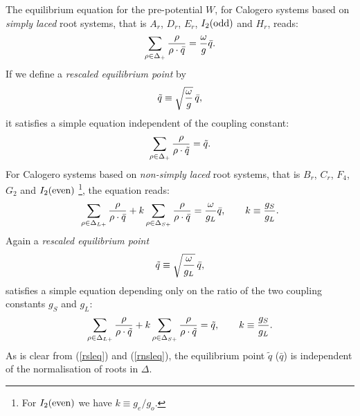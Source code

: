 \documentclass[a4paper,12pt]{article}
\begin{document}
The equilibrium equation for the pre-potential $W$,
for Calogero systems based on {\em simply laced\/} root systems,
that is $A_r$, $D_r$, $E_r$, $I_2(\rm odd)$ and $H_r$, reads:
\[
   \sum_{\rho\in\Delta_+}{\rho\over{\rho\cdot\bar{q}}}={\omega\over{g}}\bar{q}.
\]
If we define a {\em rescaled equilibrium point\/} by
\begin{equation}
   \tilde{q}\equiv \sqrt{\omega\over g}\,\bar{q},
\end{equation}
it satisfies a simple equation independent of the coupling constant:
\begin{equation}
   \sum_{\rho\in\Delta_+}{\rho\over{\rho\cdot\tilde{q}}}=\tilde{q}.
   \label{rsleq}
\end{equation}
For Calogero systems based on {\em non-simply laced\/} root systems,
that is $B_r$, $C_r$, $F_4$, $G_2$ and $I_2(\rm even)$%
\footnote{For $I_2(\rm even)$ we have $k\equiv g_e/g_o$.},
the equation reads:
\[
   \sum_{\rho\in\Delta_{L+}}{\rho\over{\rho\cdot\bar{q}}}+
   k\sum_{\rho\in\Delta_{S+}}{\rho\over{\rho\cdot\bar{q}}}=
   {\omega\over{g_L}}\bar{q},
   \qquad k\equiv{g_S\over{g_L}}.
\]
Again a {\em rescaled equilibrium point\/}
\begin{equation}
   \tilde{q}\equiv \sqrt{\omega\over g_L}\,\bar{q},
\end{equation}
satisfies a simple equation depending only on the ratio
of the two coupling constants $g_S$ and $g_L$:
\begin{equation}
   \sum_{\rho\in\Delta_{L+}}{\rho\over{\rho\cdot\tilde{q}}}+
   k\sum_{\rho\in\Delta_{S+}}{\rho\over{\rho\cdot\tilde{q}}}=\tilde{q},
   \qquad k\equiv{g_S\over{g_L}}.
   \label{rnsleq}
\end{equation}
As is clear from (\ref{rsleq}) and (\ref{rnsleq}), the equilibrium
point $\tilde{q}$ ($\bar{q}$) is independent of the normalisation of
roots in $\Delta$.
\end{document}

